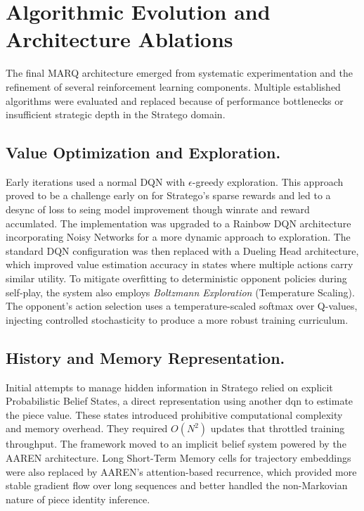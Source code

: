 \section{Algorithmic Evolution and Architecture Ablations}

The final MARQ architecture emerged from systematic experimentation and the refinement of several reinforcement learning components. Multiple established algorithms were evaluated and replaced because of performance bottlenecks or insufficient strategic depth in the Stratego domain.

\subsection{Value Optimization and Exploration.} 
Early iterations used a normal DQN with $\epsilon$-greedy exploration. This approach proved to be a challenge early on for Stratego's sparse rewards and led to a desync of loss to seing model improvement though winrate and reward accumlated. The implementation was upgraded to a Rainbow DQN architecture incorporating Noisy Networks for a more dynamic approach to exploration. The standard DQN configuration was then replaced with a Dueling Head architecture, which improved value estimation accuracy in states where multiple actions carry similar utility. To mitigate overfitting to deterministic opponent policies during self-play, the system also employs \textit{Boltzmann Exploration} (Temperature Scaling). The opponent's action selection uses a temperature-scaled softmax over Q-values, injecting controlled stochasticity to produce a more robust training curriculum.

\subsection{History and Memory Representation.} 
Initial attempts to manage hidden information in Stratego relied on explicit Probabilistic Belief States, a direct representation using another dqn to estimate the piece value. These states introduced prohibitive computational complexity and memory overhead. They required $O(N^2)$ updates that throttled training throughput. The framework moved to an implicit belief system powered by the AAREN architecture. Long Short-Term Memory cells for trajectory embeddings were also replaced by AAREN's attention-based recurrence, which provided more stable gradient flow over long sequences and better handled the non-Markovian nature of piece identity inference.

